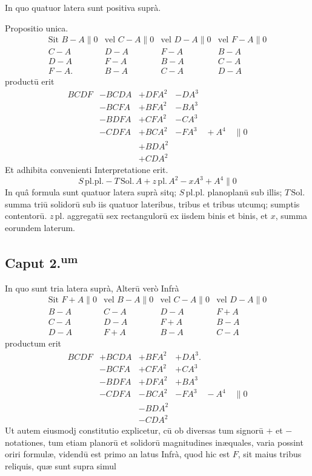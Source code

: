 \documentclass[11pt,a4paper]{article}
\begin{document}
In quo quatuor latera sunt positiva suprà.

Propositio unica.
\[ \begin{array}{llll} \text{Sit } B - A \parallel 0 & \text{vel } C - A \parallel 0 & \text{vel } D - A \parallel 0 & \text{vel } F - A \parallel 0 \\ C - A & D - A & F - A & B - A \\ D - A & F - A & B - A & C - A \\ F - A. & B - A & C - A & D - A \end{array} \]
productū erit
\[ \begin{array}{llll} BCDF & - BCDA & + DFA^{2} & - DA^{3} \\ & - BCFA & + BFA^{2} & - BA^{3} \\ & - BDFA & + CFA^{2} & - CA^{3} \\ & - CDFA & + BCA^{2} & - FA^{3} \quad + A^{4} \quad \parallel 0 \\ & & + BDA^{2} & \\ & & + CDA^{2} & \end{array} \]
Et adhibita convenienti Interpretatione erit.
\[ S\,\mathrm{pl.pl.} - T\,\mathrm{Sol.}\,A + z\,\mathrm{pl.}\,A^{2} - xA^{3} + A^{4} \parallel 0 \]
In quâ formula sunt quatuor latera suprà sitq; $S\,\mathrm{pl.pl.}$ planoplanū sub illis; $T\,\mathrm{Sol.}$ summa triū solidorū sub iis quatuor lateribus, tribus et tribus utcumq; sumptis contentorū. $z\,\mathrm{pl.}$ aggregatū sex rectangulorū ex iisdem binis et binis, et $x$, summa eorundem laterum.

\subsection*{Caput 2.\textsuperscript{um}}

In quo sunt tria latera suprà, Alterū verò Infrà
\[ \begin{array}{llll} \text{Sit } F + A \parallel 0 & \text{vel } B - A \parallel 0 & \text{vel } C - A \parallel 0 & \text{vel } D - A \parallel 0 \\ B - A & C - A & D - A & F + A \\ C - A & D - A & F + A & B - A \\ D - A & F + A & B - A & C - A \end{array} \]
productum erit
\[ \begin{array}{llll} BCDF & + BCDA & + BFA^{2} & + DA^{3}. \\ & - BCFA & + CFA^{2} & + CA^{3} \\ & - BDFA & + DFA^{2} & + BA^{3} \\ & - CDFA & - BCA^{2} & - FA^{3} \quad - A^{4} \quad \parallel 0 \\ & & - BDA^{2} & \\ & & - CDA^{2} & \end{array} \]
Ut autem eiusmodj constitutio explicetur, cū ob diversas tum signorū $+$ et $-$ notationes, tum etiam planorū et solidorū magnitudines inæquales, varia possint oriri formulæ, videndū est primo an latus Infrà, quod hic est $F$, sit maius tribus reliquis, quæ sunt supra simul
\end{document}
